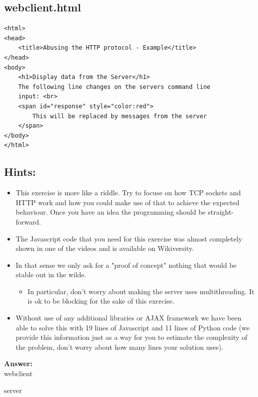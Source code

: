 \documentclass{WeSTassignment}
\begin{document}
\subsection{webclient.html}
\begin{lstlisting}
<html>
<head>
	<title>Abusing the HTTP protocol - Example</title>
</head>
<body>
	<h1>Display data from the Server</h1>
	The following line changes on the servers command line
	input: <br>
	<span id="response" style="color:red">
		This will be replaced by messages from the server
	</span>
</body>
</html>
\end{lstlisting}

\subsection{Hints:}
\begin{itemize}
\item This exercise is more like a riddle. Try to focuse on how TCP sockets and HTTP work and how you could make use of that to achieve the expected behaviour. Once you have an idea the programming should be straight-forward. 
\item The Javascript code that you need for this exercise was almost completely shown in one of the videos and is available on Wikiversity.
\item In that sense we only ask for a "proof of concept" nothing that would be stable out in the wilde.
  \begin{itemize}
  	\item In particular, don't worry about making the server uses multithreading. It is ok to be blocking for the sake of this exercise.
  \end{itemize}
\item Without use of any additional libraries or AJAX framework we have been able to solve this with 19 lines of Javascript and 11 lines of Python code (we provide this information just as a way for you to estimate the complexity of the problem, don't worry about how many lines your solution uses).
\end{itemize}

\textbf{Answer:}\\
webclient


server





\end{document}

